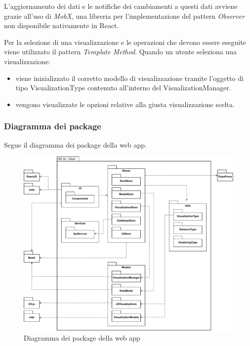     L'aggiornamento dei dati e le notifiche dei cambiamenti a questi dati avviene grazie all'uso di \emph{MobX}, una libreria per l'implementazione del pattern \emph{Observer} non disponibile nativamente in React.
    
    Per la selezione di una visualizzazione e le operazioni che devono essere eseguite viene utilizzato il pattern \emph{Template Method}.
    Quando un utente seleziona una visualizzazione:
    \begin{itemize}
        \item viene inizializzato il corretto modello di visualizzazione tramite l'oggetto di tipo VisualizationType contenuto all'interno del VisualizationManager.
        \item vengono visualizzate le opzioni relative alla giusta visualizzazione scelta.
    \end{itemize}
    
    \pagebreak
    
    \subsubsection{Diagramma dei package}
    Segue il diagramma dei package della web app.
    
    \begin{figure}[htbp]
        \centering
        \includegraphics[width=1\textwidth]{source/img/package.pdf}
        \caption{Diagramma dei package della web app}
    \end{figure}
    
